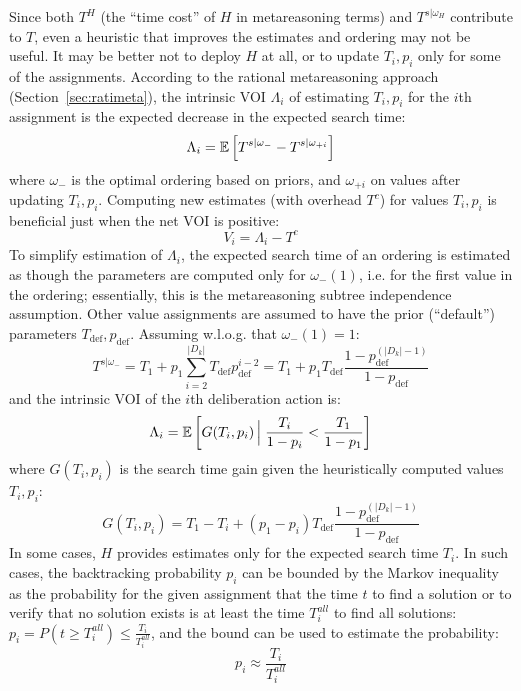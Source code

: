Since both $T^H$ (the ``time cost'' of $H$ in metareasoning terms)
and $T^{s|\omega_H}$ contribute to $T$, even a heuristic that
improves the estimates and ordering may not be useful.  It may be better not
to deploy $H$ at all, or to update $T_i, p_i$ only for some of the assignments.
According to the rational metareasoning approach (Section~\ref{sec:ratimeta}),
the intrinsic VOI $\Lambda_i$ of estimating $T_i, p_i$ for the $i$th assignment
is the expected decrease in the expected search time:
\begin{equation}
\label{eq:value-ordering-benefit}
\Lambda_i=\mathbb{E}\left[T^{s|\omega_-}-T^{s|\omega_{+i}}\right]
\end{equation}
where $\omega_-$ is the optimal ordering based on priors,
and $\omega_{+i}$ on values after updating $T_i, p_i$.
Computing new estimates (with overhead $T^c$) for values $T_i, p_i$
is beneficial just when the net VOI is positive:
\begin{equation}
\label{eq:voi}
V_i=\Lambda_i-T^c
\end{equation}
To simplify estimation of $\Lambda_i$, the expected
search time of an ordering is estimated as though the parameters are
computed only for $\omega_-(1)$, i.e. for the first value in the ordering;
essentially, this is the metareasoning subtree independence assumption.
 Other value assignments are assumed to have the prior (``default'')
parameters $T_\mathrm{def}, p_\mathrm{def}$. Assuming w.l.o.g. that $\omega_-(1)=1$:
\begin{equation}
\label{eq:time-estimate}
T^{s|\omega_-}=T_1+p_1\sum_{i=2}^{|D_k|}T_\mathrm{def}p_\mathrm{def}^{i-2}
   =T_1+p_1T_\mathrm{def}\frac{1-p_\mathrm{def}^{(|D_k|-1)}} {1-p_\mathrm{def}}
\end{equation}
and the intrinsic VOI of the $i$th deliberation action is:
\begin{equation}
\label{eq:benefit-estimate}
\Lambda_i=\mathbb{E}\left[G(T_i, p_i)\,\Big|\;\frac {T_i} {1-p_i} < \frac {T_1} {1-p_1}\right]
\end{equation}
where $G(T_i, p_i)$ is the search time gain given the heuristically computed values $T_i, p_i$:
\begin{equation}
\label{eq:gain}
G(T_i, p_i) = T_1-T_i+(p_1-p_i)T_\mathrm{def}\frac{1-p_\mathrm{def}^{(|D_k|-1)}}{1-p_\mathrm{def}}
\end{equation}
In some cases, $H$ provides estimates only for the expected
search time $T_i$. In such cases, the backtracking probability $p_i$
can be bounded by the Markov inequality as the probability for the
given assignment that the time $t$ to find a solution or to verify that
no solution exists is at least the time $T_i^{all}$ to find all
solutions: $p_i=P\left(t\ge T_i^{all}\right)\le \frac{T_i} {T_i^{all}}$, 
and the bound can be used to estimate the probability:
\begin{equation}
\label{eq:backtracking-probability-estimate}
p_i\approx\frac{T_i} {T_i^{all}}
\end{equation}

